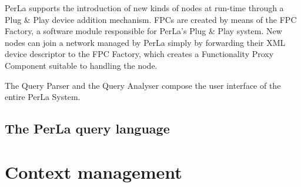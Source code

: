 PerLa supports the introduction of new
kinds of nodes at run-time through a Plug \& Play device addition mechanism.
FPCs are created by means of the FPC Factory, a software module responsible for
PerLa’s Plug \& Play system. New nodes can join a network managed by PerLa
simply by forwarding their XML device descriptor to the FPC Factory, which
creates a Functionality Proxy Component suitable to handling the node.

The Query Parser and the Query Analyser compose the user interface of the
entire PerLa System.

\subsection{The PerLa query language}

\section{Context management}

